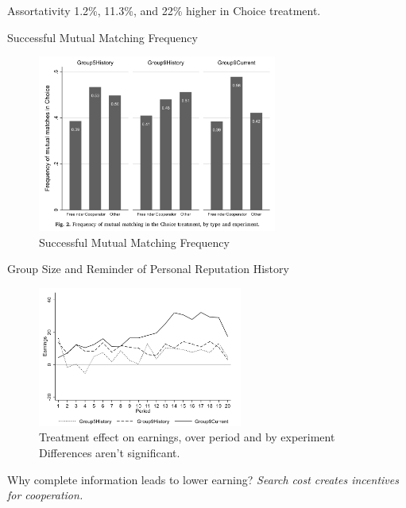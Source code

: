 \documentclass[
  10pt,
  ignorenonframetext,
  aspectratio=43,
]{beamer}
\begin{document}
\begin{frame}
\begin{block}{Assortativity}
\protect\hypertarget{assortativity}{}
1.2\%, 11.3\%, and 22\% higher in Choice treatment.
\end{block}

\begin{block}{Successful Mutual Matching Frequency}
\protect\hypertarget{successful-mutual-matching-frequency}{}
\begin{figure}
\centering
\includegraphics[width=0.7\textwidth,height=\textheight]{20220426-serdarevic-nina-it-pays-to-be-nice.assets/Pasted image 20220424001146.png}
\caption{Successful Mutual Matching Frequency}
\end{figure}
\end{block}
\end{frame}

\begin{frame}{Group Size and Reminder of Personal Reputation History}
\protect\hypertarget{group-size-and-reminder-of-personal-reputation-history}{}
\begin{figure}
\centering
\includegraphics[width=0.6\textwidth,height=\textheight]{20220426-serdarevic-nina-it-pays-to-be-nice.assets/Pasted image 20220424001923.png}
\caption{Treatment effect on earnings, over period and by experiment
\newline \footnotesize Differences aren't significant.}
\end{figure}

\normalsize Why complete information leads to lower earning?
\emph{Search cost creates incentives for cooperation.}
\end{frame}
\end{document}
